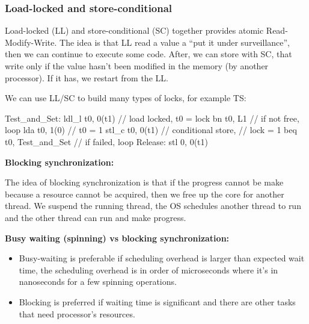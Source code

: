     \subsubsection{Load-locked and store-conditional}
    \begin{tcolorbox}[rouge]
        Load-locked (LL) and store-conditional (SC) together provides atomic Read-Modify-Write. The idea is that LL read a value a ``put it under surveillance'', then we can continue to execute some code. After, we can store with SC, that write only if the value hasn't been modified in the memory (by another processor). If it has, we restart from the LL.
    \end{tcolorbox}
    We can use LL/SC to build many types of locks, for example TS:
    \begin{codeCenter}
    \begin{Ccode}
Test_and_Set:
    ldl_l t0, 0(t1)         // load locked, t0 = lock
    bn t0, L1               // if not free, loop
    lda t0, 1(0)            // t0 = 1
    stl_c t0, 0(t1)         // conditional store,
                            // lock = 1
    beq t0, Test_and_Set    // if failed, loop
Release:
    stl 0, 0(t1)
    \end{Ccode}
    \end{codeCenter}
    \begin{tcolorbox}[violet]
    \textbf{Blocking synchronization:}

    The idea of blocking synchronization is that if the progress cannot be make because a resource cannot be acquired, then we free up the core for another thread. We suspend the running thread, the OS schedules another thread to run and the other thread can run and make progress.
    \end{tcolorbox}
    \begin{tcolorbox}[gris]
        \textbf{Busy waiting (spinning) vs blocking synchronization:}
        \begin{itemize}[left=10pt, label=\textbullet]
            \item Busy-waiting is preferable if scheduling overhead is larger than expected wait time, the scheduling overhead is in order of microseconds where it's in nanoseconds for a few spinning operations.
            \item Blocking is preferred if waiting time is significant and there are other tasks that need processor's resources.
        \end{itemize}
    \end{tcolorbox}
